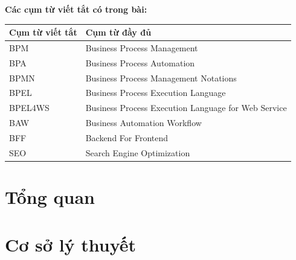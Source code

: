 \documentclass[a4paper, twoside, 12pt]{report}
\theoremstyle{definition}
\begin{document}
\setlength{\parskip}{0mm}

\tableofcontents

\newpage
\listoffigures
\newpage

\listoftables

\newpage
\textbf{Các cụm từ viết tắt có trong bài:}
{
	\setlength\extrarowheight{6pt}
	\begin{longtable}{| p{4cm} | p{11cm} |}

		\hline
		\textbf{Cụm từ viết tắt} & \textbf{Cụm từ đầy đủ}                              \\
		\hline
		BPM                      & Business Process Management                         \\
		\hline
		BPA                      & Business Process Automation                         \\
		\hline
		BPMN                     & Business Process Management Notations               \\
		\hline
		BPEL                     & Business Process Execution Language                 \\
		\hline
		BPEL4WS                  & Business Process Execution Language for Web Service \\
		\hline
		BAW                      & Business Automation Workflow                        \\
		\hline
		BFF                      & Backend For Frontend                                \\
		\hline
		SEO                      & Search Engine Optimization                          \\
		\hline
	\end{longtable}

}


\chapter{Tổng quan}



\chapter{Cơ sở lý thuyết}

\end{document}
